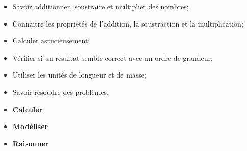 \begin{myobj}
	\begin{itemize}
		\item Savoir additionner, soustraire et multiplier des nombres;
		\item Connaitre les propriétés de l’addition, la soustraction et la multiplication;
		\item Calculer astucieusement;
		\item Vérifier si un résultat semble correct avec un ordre de grandeur;
		\item Utiliser les unités de longueur et de masse;
		\item Savoir résoudre des problèmes.
	\end{itemize}
\end{myobj}

\begin{mycomp}
	\begin{itemize}
		\item \textbf{Calculer}
		\item \textbf{Modéliser}
		\item \textbf{Raisonner}
	\end{itemize}

\end{mycomp}